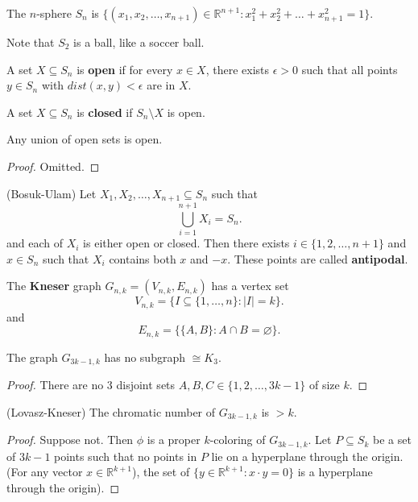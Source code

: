
\begin{definition}
	The \( n \)-sphere \( S_n \) is \( \{(x_{1}, x_{2}, \ldots , x_{n+1})  \in \mathbb{R}^{n+1} : x_{1}^2+x_{2}^2+\ldots +x_{n+1}^2 = 1 \} \).
\end{definition}

Note that \( S_2 \) is a ball, like a soccer ball.

\begin{definition}
	A set \( X \subseteq S_n \) is \textbf{open} if for every \( x \in X \), there exists \( \epsilon >0 \) such that all points \( y \in S_n \) with \( dist(x, y) < \epsilon  \) are in \( X \).
\end{definition}

\begin{definition}
	A set \( X \subseteq S_{n} \) is \textbf{closed} if \( S_n \setminus X \) is open.
\end{definition}

\begin{lemma}
	Any union of open sets is open.
\end{lemma}
\begin{proof}
	Omitted.
\end{proof}

\begin{theorem}
	(Bosuk-Ulam) Let \( X_{1}, X_{2}, \ldots , X_{n+1} \subseteq S_n \) such that \[
		\bigcup_{i=1}^{n+1}X_i = S_n 
	.\] and each of \( X_i \) is either open or closed. Then there exists \( i \in \{1, 2, \ldots , n+1\}   \) and \( x \in S_n \) such that \( X_i \) contains both \( x  \) and \( -x \). These points are called \textbf{antipodal}.
\end{theorem}

\begin{definition}
	The \textbf{Kneser} graph \( G_{n,k} = (V_{n,k}, E_{n,k}) \) has a vertex set \[
		V_{n,k}= \{I \subseteq \{1, \ldots , n\} : |I| = k \}  
	.\]  and \[
		E_{n,k} = \{\{A,B\} : A\cap B = \varnothing \}  
	.\] 
\end{definition}

\begin{lemma}
	The graph \( G_{3k-1, k} \) has no subgraph \( \cong K_3 \).
\end{lemma}
\begin{proof}
	There are no 3 disjoint sets \( A, B, C \in \{1, 2, \ldots , 3k-1\}   \) of size \( k \).
\end{proof}

\begin{theorem}
	(Lovasz-Kneser) The chromatic number of \( G_{3k-1, k} \) is \( >k \).
\end{theorem}
\begin{proof}
	Suppose not. Then \( \phi  \) is a proper \( k \)-coloring of \( G_{3k-1, k} \). Let \( P \subseteq S_k \) be a set of \( 3k-1 \) points such that no points in \( P \) lie on a hyperplane through the origin. (For any vector \( x \in \mathbb{R}^{k+1}  \)), the set of \( \{y \in \mathbb{R}^{k+1} : x \cdot y = 0 \}   \) is a hyperplane through the origin).
\end{proof}
